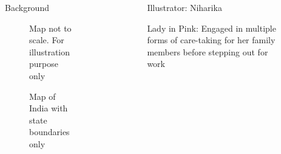 \documentclass[final]{beamer}
\newlength{\sepwidth}
\newlength{\colwidth}
\newcommand{\separatorcolumn}{\begin{column}{\sepwidth}\end{column}}
\begin{document}
\begin{frame}[t]
\begin{columns}[t]
\begin{column}{\colwidth}
\begin{block}{Background}
\begin{figure}
%
                {Map not to scale. For illustration purpose only}
\caption{Map of India with state boundaries only}
\end{figure}
  \end{block}
\end{column}

\separatorcolumn

\begin{column}{\colwidth}

\begin{figure}
%
                  {Illustrator: Niharika}
      \vspace{-1.2cm}  
\caption{Lady in Pink: Engaged in multiple forms of care-taking for her family members
before stepping out for work}
\end{figure}


\end{column}
\end{columns}
\end{frame}
\end{document}
